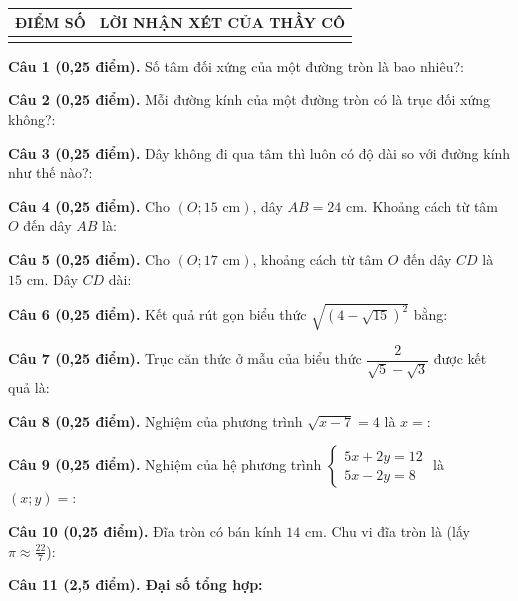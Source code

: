 \documentclass[12pt,a4paper]{article}
\begin{document}
\vspace{1.0mm}

\noindent
\begin{tabularx}{\linewidth}{|p{3.2cm}|X|}
\hline
\centering\textbf{ĐIỂM SỐ} & \centering\textbf{LỜI NHẬN XÉT CỦA THẦY CÔ} \tabularnewline
\hline
\rule{0pt}{1.8cm} & \tabularnewline
\hline
\end{tabularx}

\vspace{1.2mm}
\noindent\textbf{Câu 1 (0,25 điểm).} Số tâm đối xứng của một đường tròn là bao nhiêu?: \par\vspace{0.6mm}
\noindent\textbf{Câu 2 (0,25 điểm).} Mỗi đường kính của một đường tròn có là trục đối xứng không?: \par\vspace{0.6mm}
\noindent\textbf{Câu 3 (0,25 điểm).} Dây không đi qua tâm thì luôn có độ dài so với đường kính như thế nào?: \par\vspace{0.6mm}
\noindent\textbf{Câu 4 (0,25 điểm).} Cho $(O; 15\text{ cm})$, dây $AB = 24\text{ cm}$. Khoảng cách từ tâm $O$ đến dây $AB$ là: \par\vspace{0.6mm}
\noindent\textbf{Câu 5 (0,25 điểm).} Cho $(O; 17\text{ cm})$, khoảng cách từ tâm $O$ đến dây $CD$ là $15\text{ cm}$. Dây $CD$ dài: \par\vspace{0.6mm}
\noindent\textbf{Câu 6 (0,25 điểm).} Kết quả rút gọn biểu thức $\sqrt{(4 - \sqrt{15})^2}$ bằng: \par\vspace{0.6mm}
\noindent\textbf{Câu 7 (0,25 điểm).} Trục căn thức ở mẫu của biểu thức $\dfrac{2}{\sqrt{5}-\sqrt{3}}$ được kết quả là: \par\vspace{0.6mm}
\noindent\textbf{Câu 8 (0,25 điểm).} Nghiệm của phương trình $\sqrt{x - 7} = 4$ là $x = $: \par\vspace{0.6mm}
\noindent\textbf{Câu 9 (0,25 điểm).} Nghiệm của hệ phương trình $\begin{cases} 5x + 2y = 12 \\ 5x - 2y = 8 \end{cases}$ là $(x; y) = $: \par\vspace{0.6mm}
\noindent\textbf{Câu 10 (0,25 điểm).} Đĩa tròn có bán kính $14\text{ cm}$. Chu vi đĩa tròn là (lấy $\pi \approx \frac{22}{7}$): \par\vspace{0.6mm}
\vspace{0.8mm}
\noindent\textbf{Câu 11 (2,5 điểm). Đại số tổng hợp:}
\vspace{0.6mm}
\end{document}
